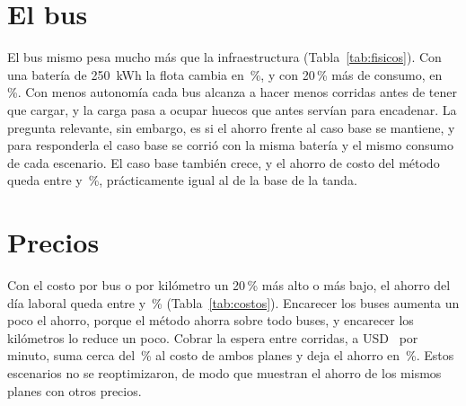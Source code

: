 \section{El bus}
\label{sec:sens-bus}

El bus mismo pesa mucho más que la infraestructura (Tabla~\ref{tab:fisicos}). Con una batería de 250~kWh la flota cambia en \FisDeltaBusesBatDoscientosCincuenta\,\%, y con 20\,\% más de consumo, en \FisDeltaBusesConsumoVeinte\,\%. Con menos autonomía cada bus alcanza a hacer menos corridas antes de tener que cargar, y la carga pasa a ocupar huecos que antes servían para encadenar. La pregunta relevante, sin embargo, es si el ahorro frente al caso base se mantiene, y para responderla el caso base se corrió con la misma batería y el mismo consumo de cada escenario. El caso base también crece, y el ahorro de costo del método queda entre \FisAhorroMin{} y \FisAhorroMax\,\%, prácticamente igual al de la base de la tanda.

\begin{table}[htbp]
\centering
\caption{Sensibilidad a la batería y al consumo, día laboral. Cuartetos al azar con 20 minutos y una semilla; el caso base usa la misma batería y el mismo consumo de cada escenario.}
\label{tab:fisicos}
\footnotesize
{}
\end{table}

\section{Precios}
\label{sec:sens-precios}

Con el costo por bus o por kilómetro un 20\,\% más alto o más bajo, el ahorro del día laboral queda entre \CostosAhorroMin{} y \CostosAhorroMax\,\% (Tabla~\ref{tab:costos}). Encarecer los buses aumenta un poco el ahorro, porque el método ahorra sobre todo buses, y encarecer los kilómetros lo reduce un poco. Cobrar la espera entre corridas, a USD~\CostoEsperaMinuto{} por minuto, suma cerca del \PctEspera\,\% al costo de ambos planes y deja el ahorro en \AhorroConEspera\,\%. Estos escenarios no se reoptimizaron, de modo que muestran el ahorro de los mismos planes con otros precios.

